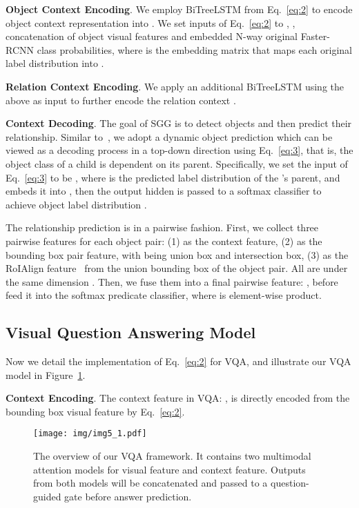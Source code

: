 \documentclass[10pt,twocolumn,letterpaper]{article}
\begin{document}
\noindent\textbf{Object Context Encoding}. We employ BiTreeLSTM from Eq.~\eqref{eq:2} to encode object context representation into . We set inputs  of Eq.~\eqref{eq:2} to , \ie, concatenation of object visual features and embedded N-way original Faster-RCNN class probabilities, where  is the embedding matrix that maps each original label distribution  into .

\noindent\textbf{Relation Context Encoding}. We apply an additional BiTreeLSTM using the above  as input  to further encode the relation context . 

\noindent\textbf{Context Decoding}. The goal of SGG is to detect objects and then predict their relationship. Similar to~\cite{zellers2017neural}, we adopt a dynamic object prediction which can be viewed as a decoding process in a top-down direction using Eq.~\eqref{eq:3}, that is, the object class of a child is dependent on its parent. Specifically, we set the input  of Eq.~\eqref{eq:3} to be , where  is the predicted label distribution of the 's parent, and  embeds it into , then the output hidden is passed to a softmax classifier to achieve object label distribution . 

The relationship prediction is in a pairwise fashion. First, we collect three pairwise features for each object pair: (1)  as the context feature, (2)  as the bounding box pair feature, with  being union box and intersection box, (3)  as the RoIAlign feature~\cite{he2017mask} from the union bounding box of the object pair. All  are under the same dimension . Then, we fuse them into a final pairwise feature: , before feed it into the softmax predicate classifier, where  is element-wise product.














\subsection{Visual Question Answering Model}
\label{subsection:3_4}
Now we detail the implementation of Eq.~\eqref{eq:2} for VQA, and illustrate our VQA model in Figure~\ref{fig:5}.

\noindent\textbf{Context Encoding}. The context feature in VQA: ,  is directly encoded from the bounding box visual feature  by Eq.~\eqref{eq:2}.

\begin{figure}
   \begin{minipage}[b]{1.0\linewidth}
   \centerline{\texttt{[image: img/img5\_1.pdf]}}
   \end{minipage}
   \caption{The overview of our VQA framework. It contains two multimodal attention models for visual feature and context feature. Outputs from both models will be concatenated and passed to a question-guided gate before answer prediction.}
   \vspace{-0.1in}
   \label{fig:5} \end{figure}
\end{document}
